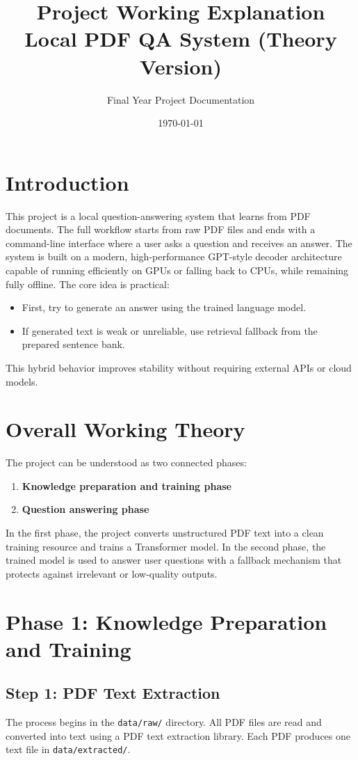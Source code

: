 \documentclass[a4paper,11pt]{article}
\title{Project Working Explanation\\\large Local PDF QA System (Theory Version)}
\author{Final Year Project Documentation}
\date{\today}
\begin{document}
\maketitle
\tableofcontents
\newpage

\section{Introduction}
This project is a local question-answering system that learns from PDF documents.
The full workflow starts from raw PDF files and ends with a command-line interface where a user asks a question and receives an answer.
The system is built on a modern, high-performance GPT-style decoder architecture capable of running efficiently on GPUs or falling back to CPUs, while remaining fully offline.
The core idea is practical:
\begin{itemize}[leftmargin=1.5em]
    \item First, try to generate an answer using the trained language model.
    \item If generated text is weak or unreliable, use retrieval fallback from the prepared sentence bank.
\end{itemize}

This hybrid behavior improves stability without requiring external APIs or cloud models.

\section{Overall Working Theory}
The project can be understood as two connected phases:
\begin{enumerate}[leftmargin=1.5em]
    \item \textbf{Knowledge preparation and training phase}
    \item \textbf{Question answering phase}
\end{enumerate}

In the first phase, the project converts unstructured PDF text into a clean training resource and trains a Transformer model.
In the second phase, the trained model is used to answer user questions with a fallback mechanism that protects against irrelevant or low-quality outputs.

\section{Phase 1: Knowledge Preparation and Training}
\subsection{Step 1: PDF Text Extraction}
The process begins in the \texttt{data/raw/} directory.
All PDF files are read and converted into text using a PDF text extraction library.
Each PDF produces one text file in \texttt{data/extracted/}.
\end{document}
